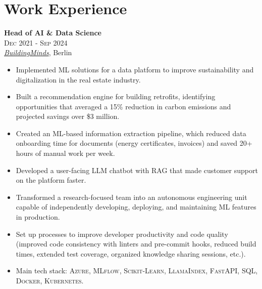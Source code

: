 \documentclass[a4paper,9.5pt]{article}
\begin{document}
\hfill
\begin{minipage}[t]{0.65\textwidth}

\section{Work Experience}

\small
\vspace{1.5mm}
\textbf{Head of AI \& Data Science}\\
\textsc{Dec 2021 - Sep 2024}\\
\emph{\href{https://buildingminds.com/}{BuildingMinds}}, Berlin
\vspace{2.5mm}
\begin{itemize}[leftmargin=1em, itemsep=1mm, parsep=0.5mm]
  \item Implemented ML solutions for a data platform to improve sustainability and digitalization in the real estate industry.
  \item Built a recommendation engine for building retrofits, identifying opportunities that averaged a 15\% reduction in carbon emissions and projected savings over \$3 million.
  \item Created an ML-based information extraction pipeline, which reduced data onboarding time for documents (energy certificates, invoices) and saved 20+ hours of manual work per week.
  \item Developed a user-facing LLM chatbot with RAG that made customer support on the platform faster.
  \item Transformed a research-focused team into an autonomous engineering unit capable of independently developing, deploying, and maintaining ML features in production.
  \item Set up processes to improve developer productivity and code quality (improved code consistency with linters and pre-commit hooks, reduced build times, extended test coverage, organized knowledge sharing sessions, etc.).
  \item Main tech stack: \textsc{Azure}, \textsc{MLflow}, \textsc{Scikit-Learn}, \textsc{LlamaIndex}, \textsc{FastAPI}, \textsc{SQL}, \textsc{Docker}, \textsc{Kubernetes}.
\end{itemize}
\vspace{2mm}


\end{minipage}
\end{document}
